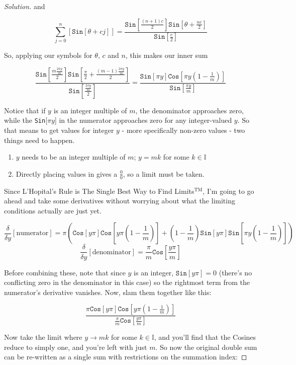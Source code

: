 \documentclass[12pt]{article}
\begin{document}
\begin{proof}[Solution]
and

$$\sum_{j=0}^n\left[\texttt{Sin}\left[\theta+cj\right]\right]=\frac{\texttt{Sin}\left[\frac{(n+1)c}{2}\right]\texttt{Sin}\left[\theta+\frac{nc}{2}\right]}{\texttt{Sin}\left[\frac{c}{2}\right]}$$

So, applying our symbols for $\theta$, $c$ and $n$, this makes our inner sum

$$\frac{\texttt{Sin}\left[\frac{m\frac{2\pi y}{m}}{2}\right]\texttt{Sin}\left[\frac{\pi}{2}+\frac{(m-1)\frac{2\pi y}{m}}{2}\right]}{\texttt{Sin}\left[\frac{\frac{2\pi y}{m}}{2}\right]}=\frac{\texttt{Sin}[\pi y]\texttt{Cos}\left[\pi y\left(1-\frac{1}{m}\right)\right]}{\texttt{Sin}\left[\frac{\pi y}{m}\right]}$$

\raggedright Notice that if $y$ is an integer multiple of $m$, the denominator approaches zero, while the \texttt{Sin}[$\pi y$] in the numerator approaches zero for any integer-valued $y$. So that means to get values for integer $y$ - more specifically non-zero values - two things need to happen.
\begin{enumerate}
\item $y$ needs to be an integer multiple of $m$; $y=mk$ for some $k\in\mathbb{I}$
\item Directly placing values in gives a $\frac{0}{0}$, so a limit must be taken.
\end{enumerate}

Since L'Hopital's Rule is The Single Best Way to Find Limits$^{\text{TM}}$, I'm going to go ahead and take some derivatives without worrying about what the limiting conditions actually are just yet.

$$\frac{\delta}{\delta y}[\text{numerator}]=\pi\left(\texttt{Cos}[y\pi]\texttt{Cos}\left[y\pi\left(1-\frac{1}{m}\right)\right]+\left(1-\frac{1}{m}\right)\texttt{Sin}[y\pi]\texttt{Sin}\left[\pi y\left(1-\frac{1}{m}\right)\right]\right)$$
$$\frac{\delta}{\delta y}[\text{denominator}]=\frac{\pi}{m}\texttt{Cos}\left[\frac{y\pi}{m}\right]$$

Before combining these, note that since $y$ is an integer, $\texttt{Sin}[y\pi]=0$ (there's no conflicting zero in the denominator in this case) so the rightmost term from the numerator's derivative vanishes. Now, slam them together like this:

$$\frac{\pi\texttt{Cos}[y\pi]\texttt{Cos}\left[y\pi\left(1-\frac{1}{m}\right)\right]}{\frac{\pi}{m}\texttt{Cos}\left[\frac{y\pi}{m}\right]}$$

Now take the limit where $y\to mk$ for some $k\in\mathbb{I}$, and you'll find that the Cosines reduce to simply one, and you're left with just $m$. So now the original double sum can be re-written as a single sum with restrictions on the summation index:


\end{proof}
\end{document}
